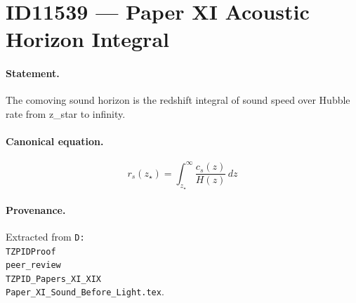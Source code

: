 \section*{ID11539 --- Paper XI Acoustic Horizon Integral}

\paragraph{Statement.}
The comoving sound horizon is the redshift integral of sound speed over Hubble rate from z_star to infinity.

\paragraph{Canonical equation.}
\[
r_s(z_\star)=\int_{z_\star}^{\infty}\frac{c_s(z)}{H(z)}\,dz
\]

\paragraph{Provenance.}
Extracted from \texttt{D:\\TZPIDProof\\peer\_review\\TZPID\_Papers\_XI\_XIX\\Paper\_XI\_Sound\_Before\_Light.tex}.
